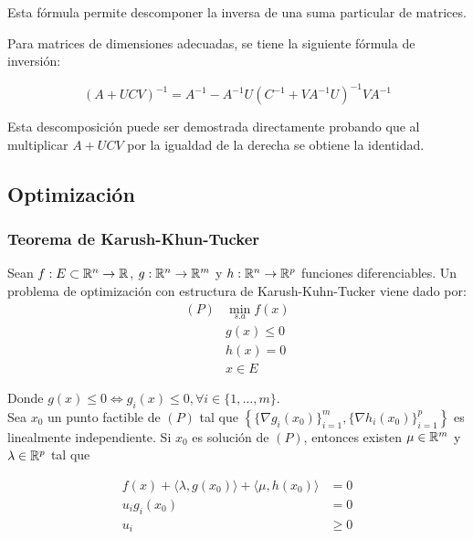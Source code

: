 Esta fórmula permite descomponer la inversa de una suma particular de matrices.

\begin{theorem}
	Para matrices de dimensiones adecuadas, se tiene la siguiente fórmula de inversión:
	
	\begin{equation}
		(A+UCV)^{-1} = A^{-1} - A^{-1}U(C^{-1}+VA^{-1}U)^{-1}VA^{-1}
	\end{equation}
\end{theorem}

Esta descomposición puede ser demostrada directamente probando que al multiplicar $A+UCV$ por la igualdad de la derecha se obtiene la identidad.

\subsection{Optimización}
\subsubsection{Teorema de Karush-Khun-Tucker}

Sean $f:E\subset\mathbb{R}^n\to\mathbb{R}$, $g:\mathbb{R}^n \to \mathbb{R}^m$ y $h:\mathbb{R}^n \to \mathbb{R}^p$ funciones diferenciables. Un problema de optimización con estructura de Karush-Kuhn-Tucker viene dado por:
\begin{equation}
	\begin{aligned}
		(P) & \min_{s.a} f(x)\\
		& g(x) \leq 0\\
		& h(x) = 0\\
		& x\in E
	\end{aligned}
\end{equation}
	

Donde $g(x) \leq 0\iff g_i(x)\leq 0,\forall i\in\{1,\ldots,m\}$.\\

Sea $x_0$ un punto factible de $(P)$ tal que $\left\{\{\nabla g_i(x_0)\}_{i=1}^m,\{\nabla h_i(x_0)\}_{i=1}^p\right\}$ es linealmente independiente. Si $x_0$ es solución de $(P)$, entonces existen $\mu\in\mathbb{R}^m$ y $\lambda\in\mathbb{R}^p$ tal que

\begin{equation}
	\begin{aligned}
		f(x) + \langle\lambda,g(x_0)\rangle + \langle\mu,h(x_0)\rangle &=0\\
		 u_i g_i(x_0) &= 0\\
		 u_i &\geq 0\\
	\end{aligned}
\end{equation}

